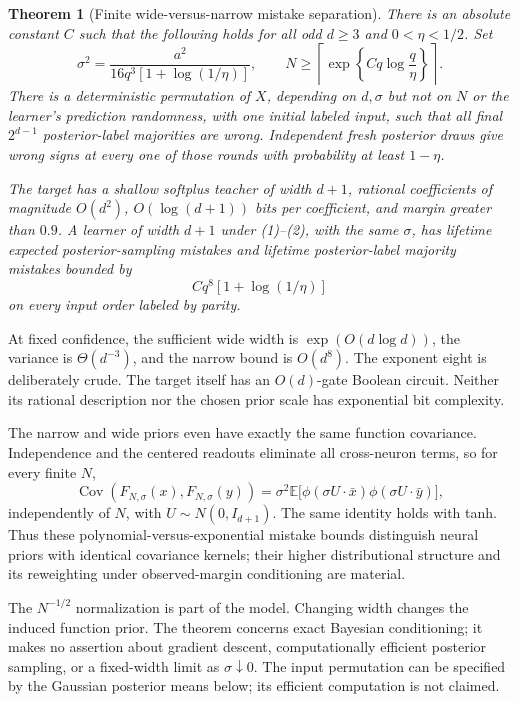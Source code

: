 \documentclass[11pt]{article}
\newtheorem{theorem}{Theorem}\newtheorem{lemma}[theorem]{Lemma}
\newcommand{\E}{\mathbb E}\newcommand{\Pp}{\mathbb P}
\begin{document}
\begin{theorem}[Finite wide-versus-narrow mistake separation]
\label{thm:main}
There is an absolute constant $C$ such that the following holds for
all odd $d\ge3$ and $0<\eta<1/2$. Set
\[
 \sigma^2=\frac{a^2}{16q^3[1+\log(1/\eta)]},\qquad
 N\ge\left\lceil\exp\left\{Cq\log\frac q\eta\right\}\right\rceil.
                                                               \tag{3}
\]
There is a deterministic permutation of $X$, depending on $d,\sigma$
but not on $N$ or the learner's prediction randomness, with one initial
labeled input, such that all final $2^{d-1}$ posterior-label majorities
are wrong. Independent fresh posterior draws give wrong signs at every
one of those rounds with probability at least $1-\eta$.

The target has a shallow softplus teacher of width $d+1$, rational
coefficients of magnitude $O(d^2)$, $O(\log(d+1))$ bits per coefficient,
and margin greater than $0.9$. A learner of width $d+1$ under (1)--(2),
with the same $\sigma$, has lifetime expected posterior-sampling mistakes
and lifetime posterior-label majority mistakes bounded by
\[
                        Cq^8[1+\log(1/\eta)]                 \tag{4}
\]
on every input order labeled by parity.
\end{theorem}
At fixed confidence, the sufficient wide width is $\exp(O(d\log d))$,
the variance is $\Theta(d^{-3})$, and the narrow bound is $O(d^8)$.
The exponent eight is deliberately crude. The target itself has an
$O(d)$-gate Boolean circuit. Neither its rational description nor the
chosen prior scale has exponential bit complexity.

The narrow and wide priors even have exactly the same function covariance.
Independence and the centered readouts eliminate all cross-neuron terms,
so for every finite $N$,
\[
 \operatorname{Cov}(F_{N,\sigma}(x),F_{N,\sigma}(y))
   =\sigma^2\E\big[\phi(\sigma U\cdot\bar x)
                         \phi(\sigma U\cdot\bar y)\big],
                                                               \tag{4a}
\]
independently of $N$, with $U\sim N(0,I_{d+1})$.
The same identity holds with tanh. Thus these
polynomial-versus-exponential mistake bounds distinguish neural priors
with identical covariance kernels; their higher distributional structure
and its reweighting under observed-margin conditioning are material.

The $N^{-1/2}$ normalization is part of the model. Changing width changes
the induced function prior. The theorem concerns exact Bayesian
conditioning; it makes no assertion about gradient descent, computationally
efficient posterior sampling, or a fixed-width limit as $\sigma\downarrow0$.
The input permutation can be specified by the Gaussian posterior means
below; its efficient computation is not claimed.
\end{document}
